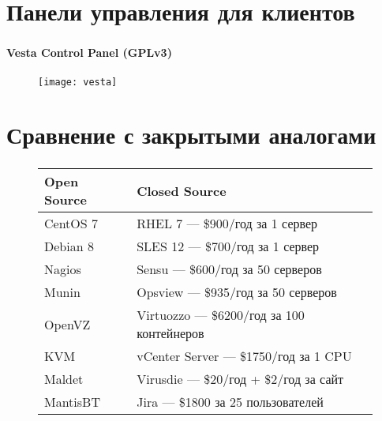 
\section{Панели управления для клиентов}

\begin{frame}
\frametitle{\insertsection}
\framesubtitle{Vesta Control Panel (GPLv3)}
\begin{figure}[h]
	\begin{center}
		\texttt{[image: vesta]}
	\end{center}
\end{figure}
\end{frame}


\section{Сравнение с закрытыми аналогами}

\begin{frame}
\frametitle{\insertsection}
\begin{figure}[h]
	\begin{center}
		\begin{tabular}{|l|p{7.5cm}|}
			\hline
			\bf{Open Source} & \bf{Closed Source} \\ \hline
			CentOS 7 & RHEL 7 --- \$900/год за 1 сервер \\
			Debian 8 & SLES 12 --- \$700/год за 1 сервер \\ \hline
			Nagios & Sensu --- \$600/год за 50 серверов \\
			Munin & Opsview --- \$935/год за 50 серверов \\ \hline
			OpenVZ & Virtuozzo --- \$6200/год за 100 контейнеров \\
			KVM & vCenter Server --- \$1750/год за 1 CPU \\ \hline
			Maldet & Virusdie --- \$20/год + \$2/год за сайт \\
			MantisBT & Jira --- \$1800 за 25 пользователей \\
			\hline
		\end{tabular}
	\end{center}
\end{figure}
\end{frame}

